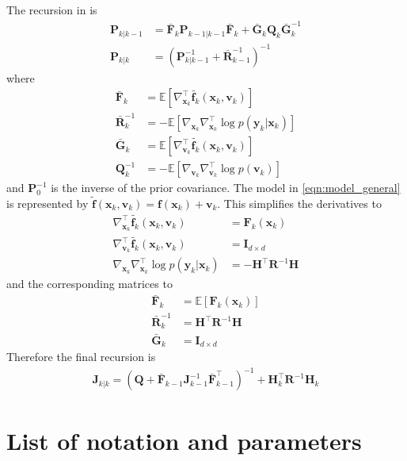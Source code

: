 \documentclass{article}
\renewcommand{\vec}[1]{\ensuremath{{\boldsymbol #1}}}
\newcommand{\mat}[1]{\ensuremath{\boldsymbol{#1}}}
\begin{document}
The recursion in \cite{Bergman2001} is
\begin{subequations}
\begin{align}
	\mat P_{k|k-1} &= \bar{\mat F}_k\mat P_{k-1|k-1}\bar{\mat F}_k + \bar{\mat G}_k\mat Q_k \bar{\mat G}_k^{-1} \\
		\mat P_{k|k} &= \left(\mat P_{k|k-1}^{-1} + \bar{\mat R}_{k-1}^{-1}\right)^{-1}
\end{align}
\end{subequations}
where
\begin{align}
	\bar{\mat F}_k &= \mathbb E \left[ \nabla_{\vec x_k}^\top \tilde{\vec f_k}(\vec x_k,\vec v_k)\right] \\
	\bar{\mat R}_k^{-1} &= -\mathbb E\left[ \nabla_{\vec x_k}\nabla_{\vec x_k}^\top \log p(\vec y_k|\vec x_k) \right] \\
	\bar{\mat G}_k &= \mathbb E \left[ \nabla_{\vec v_k}^\top \tilde{\vec f_k}(\vec x_k,\vec v_k)\right] \\
	\mat Q_k^{-1} &= -\mathbb E \left[ \nabla_{\vec v_k}\nabla_{\vec v_k}^\top \log p(\vec v_k) \right]
\end{align}
and $\mat P_0^{-1}$ is the inverse of the prior covariance. The model in \eqref{eqn:model_general} is represented by $\tilde{\vec f}(\vec x_k,\vec v_k) = \vec f(\vec x_k) + \vec v_k$. This simplifies the derivatives to
\begin{align}
	\nabla_{\vec x_k}^\top \tilde{\vec f_k}(\vec x_k,\vec v_k) &= \mat F_k(\vec x_k) \\
	\nabla_{\vec v_k}^\top \tilde{\vec f_k}(\vec x_k,\vec v_k) &= \mat I_{d\times d} \\
	\nabla_{\vec x_k}\nabla_{\vec x_k}^\top \log p(\vec y_k|\vec x_k) &= -\mat H^\top\mat R^{-1} \mat H 
\end{align}
and the corresponding matrices to	
\begin{align}
	\bar{\mat F}_k &= \mathbb E\left[ \mat F_k(\vec x_k)\right] \label{eqn:pcrb_term_F}\\
	\bar{\mat R}_k^{-1} &= \mat H^\top\mat R^{-1} \mat H \\
	\bar{\mat G}_k &= \mat I_{d\times d} 
\end{align}
Therefore the final recursion is
\begin{align}
	\mat J_{k|k} = \left( \mat Q + \bar{\mat F}_{k-1} \mat J_{k-1}^{-1} \bar{\mat F}_{k-1}^\top\right)^{-1} + \mat H_k^\top \mat R^{-1} \mat H_k
\end{align}

\section{List of notation and parameters}
\label{sec:parameter_table}
\end{document}
